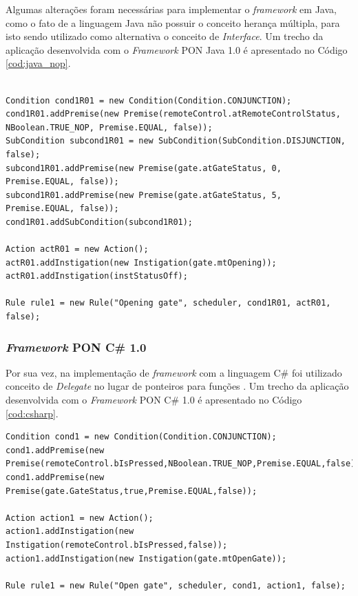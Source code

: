 Algumas alterações foram necessárias para implementar o \textit{framework} em
Java, como o fato de a linguagem Java não possuir o conceito herança múltipla,
para isto sendo utilizado como alternativa o conceito de \textit{Interface}. Um
trecho da aplicação desenvolvida com o \textit{Framework} PON Java 1.0 é
apresentado no Código \ref{cod:java_nop}.

\begin{lstlisting}[caption = {Exemplo de \textit{Rule} do portão eletrônico em Java},
source = {Adaptado de \citeonline{henzen_2015}},
label = {cod:java_nop}]

Condition cond1R01 = new Condition(Condition.CONJUNCTION);
cond1R01.addPremise(new Premise(remoteControl.atRemoteControlStatus, NBoolean.TRUE_NOP, Premise.EQUAL, false));
SubCondition subcond1R01 = new SubCondition(SubCondition.DISJUNCTION, false);
subcond1R01.addPremise(new Premise(gate.atGateStatus, 0, Premise.EQUAL, false));
subcond1R01.addPremise(new Premise(gate.atGateStatus, 5, Premise.EQUAL, false));
cond1R01.addSubCondition(subcond1R01);

Action actR01 = new Action();
actR01.addInstigation(new Instigation(gate.mtOpening));
actR01.addInstigation(instStatusOff);

Rule rule1 = new Rule("Opening gate", scheduler, cond1R01, actR01, false);
\end{lstlisting}

\subsubsection{\textit{Framework} PON C\# 1.0}\label{sec:csharp}

Por sua vez, na implementação de \textit{framework} com a linguagem C\# foi
utilizado conceito de \textit{Delegate} no lugar de ponteiros para funções
\cite{henzen_2015}. Um trecho da aplicação desenvolvida com o \textit{Framework}
PON C\# 1.0 é apresentado no Código \ref{cod:csharp}.

\begin{lstlisting}[caption = {Exemplo de \textit{Rule} do portão eletrônico em C\#},
source = {Adaptado de \citeonline{henzen_2015}},
label = {cod:csharp}]
Condition cond1 = new Condition(Condition.CONJUNCTION);
cond1.addPremise(new Premise(remoteControl.bIsPressed,NBoolean.TRUE_NOP,Premise.EQUAL,false));
cond1.addPremise(new Premise(gate.GateStatus,true,Premise.EQUAL,false));

Action action1 = new Action();
action1.addInstigation(new Instigation(remoteControl.bIsPressed,false));
action1.addInstigation(new Instigation(gate.mtOpenGate));

Rule rule1 = new Rule("Open gate", scheduler, cond1, action1, false);
\end{lstlisting}

